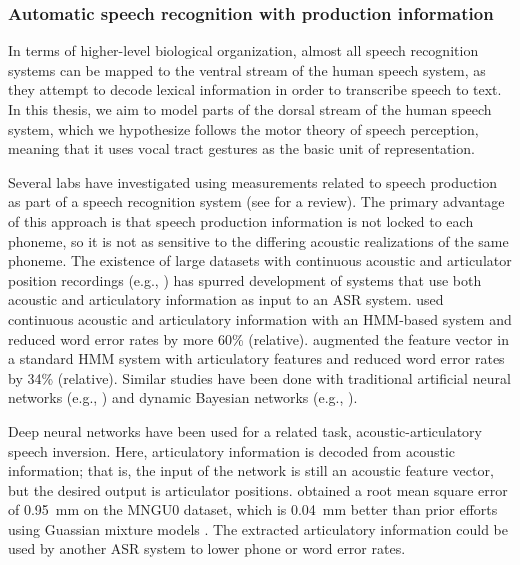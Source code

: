 \subsubsection{Automatic speech recognition with production information}
\label{sec:asr-prod}

In terms of higher-level biological organization,
almost all speech recognition systems
can be mapped
to the ventral stream of the human speech system,
as they attempt to decode
lexical information in order to
transcribe speech to text.
In this thesis, we aim to model
parts of the dorsal stream of the human speech system,
which we hypothesize follows the
motor theory of speech perception,
meaning that it uses vocal tract gestures
as the basic unit of representation.

Several labs have investigated
using measurements
related to speech production
as part of a speech recognition system
(see \citealt{king2007} for a review).
The primary advantage of this approach
is that speech production information
is not locked to each phoneme,
so it is not as sensitive to the
differing acoustic realizations
of the same phoneme.
The existence of large datasets
with continuous acoustic
and articulator position recordings
(e.g., \citealt{westbury1990,wrench2000,steiner2012})
has spurred development of
systems that use both
acoustic and articulatory information
as input to an ASR system.
\citet{zlokarnik1995}
used continuous acoustic and articulatory
information with an HMM-based system
and reduced word error rates
by more 60\% (relative).
\citet{eide2001}
augmented the feature vector
in a standard HMM system
with articulatory features and
reduced word error rates
by 34\% (relative).
Similar studies have been done
with traditional artificial neural networks
(e.g., \citealt{kirchhoff2002})
and dynamic Bayesian networks
(e.g., \citealt{stephenson2000,stephenson2004}).

Deep neural networks have been used for
a related task,
acoustic-articulatory speech inversion.
Here, articulatory information
is decoded from acoustic information;
that is, the input of the network
is still an acoustic feature vector,
but the desired output
is articulator positions.
\citet{uria2011}
obtained a root mean square error
of 0.95~mm on the MNGU0 dataset,
which is 0.04~mm better than prior
efforts using Guassian mixture models
\citep{richmond2009}.
The extracted articulatory information
could be used by another ASR system
to lower phone or word error rates.

